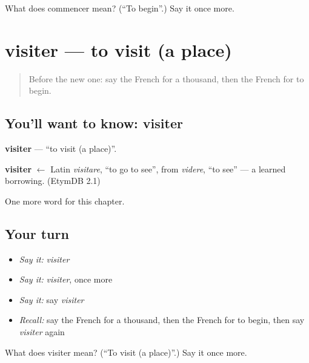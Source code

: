 \begin{tcolorbox}[breakable,colback=teal!4,colframe=teal!35!black,title={Before you move on}]
What does commencer mean? (\textquotedblleft{}To begin\textquotedblright{}.) Say it once more.
\end{tcolorbox}
\section[visiter]{visiter — to visit (a place)}

\label{lesson:FR-C137-visiter}



\begin{quote}
Before the new one: say the French for a thousand, then the French for to begin.
\end{quote}

\subsection*{You'll want to know: visiter}
\textbf{visiter} — \textquotedblleft{}to visit (a place)\textquotedblright{}.

\begin{cousinweb}
\textbf{visiter} $\leftarrow$ Latin \emph{visitare}, \textquotedblleft{}to go to see\textquotedblright{}, from \emph{videre}, \textquotedblleft{}to see\textquotedblright{} — a learned borrowing. (EtymDB 2.1)
\end{cousinweb}

\begin{grammarlens}[title={What you've built}]
One more word for this chapter.
\end{grammarlens}

\subsection*{Your turn}
\begin{itemize}
\raggedright
  \item \emph{Say it:} \emph{visiter}
  \item \emph{Say it:} \emph{visiter}, once more
  \item \emph{Say it:} say \emph{visiter}
  \item \emph{Recall:} say the French for a thousand, then the French for to begin, then say \emph{visiter} again
\end{itemize}

\begin{tcolorbox}[breakable,colback=teal!4,colframe=teal!35!black,title={Before you move on}]
What does visiter mean? (\textquotedblleft{}To visit (a place)\textquotedblright{}.) Say it once more.
\end{tcolorbox}

